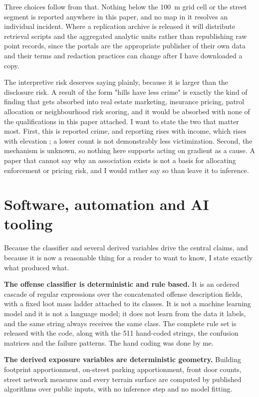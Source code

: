 \documentclass[10pt,letterpaper]{article}
\begin{document}
Three choices follow from that. Nothing below the 100~m grid cell or the street
segment is reported anywhere in this paper, and no map in it resolves an individual
incident. Where a replication archive is released it will distribute retrieval scripts
and the aggregated analytic units rather than republishing raw point records, since
the portals are the appropriate publisher of their own data and their terms and
redaction practices can change after I have downloaded a copy.

The interpretive risk deserves saying plainly, because it is larger than the
disclosure risk. A result of the form "hills have less crime" is exactly the kind of
finding that gets absorbed into real estate marketing, insurance pricing, patrol
allocation or neighbourhood risk scoring, and it would be absorbed with none of the
qualifications in this paper attached. I want to state the two that matter most.
First, this is reported crime, and reporting rises with income, which rises with
elevation \cite{yebecker2018}; a lower count is not demonstrably less victimization.
Second, the mechanism is unknown, so nothing here supports acting on gradient as a
cause. A paper that cannot say why an association exists is not a basis for allocating
enforcement or pricing risk, and I would rather say so than leave it to inference.

\section*{Software, automation and AI tooling}

Because the classifier and several derived variables drive the central claims, and
because it is now a reasonable thing for a reader to want to know, I state exactly
what produced what.

\textbf{The offense classifier is deterministic and rule based.} It is an ordered
cascade of regular expressions over the concatenated offense description fields, with
a fixed loot mass ladder attached to its classes. It is not a machine learning model
and it is not a language model; it does not learn from the data it labels, and the
same string always receives the same class. The complete rule set is released with the
code, along with the 511 hand-coded strings, the confusion matrices and the failure
patterns. The hand coding was done by me.

\textbf{The derived exposure variables are deterministic geometry.} Building footprint
apportionment, on-street parking apportionment, front door counts, street network
measures and every terrain surface are computed by published algorithms over public
inputs, with no inference step and no model fitting.
\end{document}
